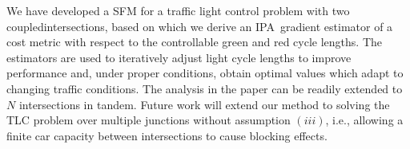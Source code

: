 \documentclass{ifacconf}\usepackage{graphicx}
\begin{document}
We have developed a SFM for a traffic light control problem with two
coupledintersections, based on which we derive an IPA\ gradient estimator of a
cost metric with respect to the controllable green and red cycle lengths. The
estimators are used to iteratively adjust light cycle lengths to improve
performance and, under proper conditions, obtain optimal values which adapt to
changing traffic conditions. The analysis in the paper can be readily extended
to $N$ intersections in tandem. Future work will extend our method to solving
the TLC problem over multiple junctions without assumption $(iii)$, i.e.,
allowing a finite car capacity between intersections to cause blocking effects.






\end{document}

